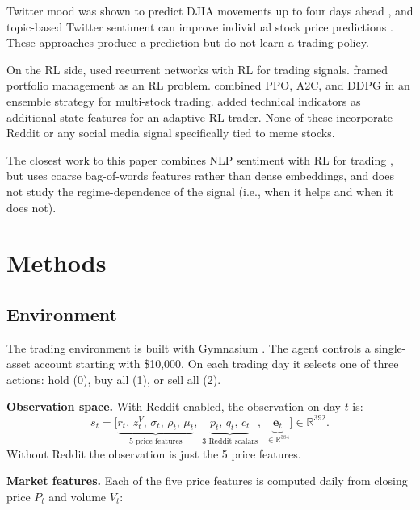 \documentclass[letterpaper,twocolumn]{article}
\begin{document}
Twitter mood was shown to predict DJIA movements up to four
days ahead \citep{bollen2011twitter}, and topic-based Twitter
sentiment can improve individual stock price predictions
\citep{si2013exploiting}.
These approaches produce a prediction but do not learn a
trading policy.

On the RL side, \citet{deng2016deep} used recurrent networks
with RL for trading signals.
\citet{jiang2017deep} framed portfolio management as an RL
problem.
\citet{yang2020deep} combined PPO, A2C, and DDPG in an
ensemble strategy for multi-stock trading.
\citet{liu2020adaptive} added technical indicators as
additional state features for an adaptive RL trader.
None of these incorporate Reddit or any social media signal
specifically tied to meme stocks.

The closest work to this paper combines NLP sentiment with RL for
trading \citep{si2013exploiting}, but uses coarse bag-of-words
features rather than dense embeddings, and does not study the
regime-dependence of the signal (i.e., when it helps and
when it does not).

\section{Methods}

\subsection{Environment}

The trading environment is built with Gymnasium
\citep{gymnasium}.
The agent controls a single-asset account starting with
\$10,000.
On each trading day it selects one of three actions:
hold (0), buy all (1), or sell all (2).

\smallskip
\noindent\textbf{Observation space.}
With Reddit enabled, the observation on day $t$ is:
\begin{equation}
  s_t = \bigl[
    \underbrace{r_t,\, z^V_t,\, \sigma_t,\, \rho_t,\,
    \mu_t}_{\text{5 price features}},\;
    \underbrace{p_t,\, q_t,\, c_t}_{\text{3 Reddit scalars}},\;
    \underbrace{\mathbf{e}_t}_{\in\mathbb{R}^{384}}
  \bigr] \in \mathbb{R}^{392}.
\end{equation}
Without Reddit the observation is just the 5 price features.

\smallskip
\noindent\textbf{Market features.}
Each of the five price features is computed daily from
closing price $P_t$ and volume $V_t$:
\end{document}
